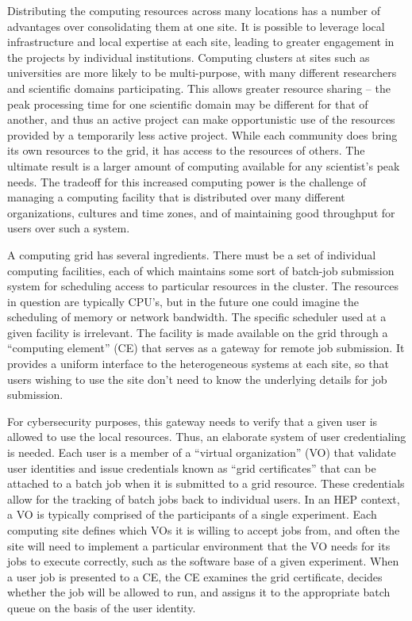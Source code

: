 Distributing the computing resources across many locations has a number of advantages over consolidating them at one site.  It is possible to leverage local infrastructure and local expertise at each site, leading to greater engagement in the projects by individual institutions.  Computing clusters at sites such as universities are more likely to be multi-purpose, with many different researchers and scientific domains participating.  This allows greater resource sharing -- the peak processing time for one scientific domain may be different for that of another, and thus an active project can make opportunistic use of the resources provided by a temporarily less active project.  While each community does bring its own resources to the grid, it has access to the resources of others.  The ultimate result is a larger amount of computing available for any scientist's peak needs.  The tradeoff for this increased computing power is the challenge of managing a computing facility that is distributed over many different organizations, cultures and time zones, and of maintaining good throughput for users over such a system.

A computing grid has several ingredients.  There must be a set of individual computing facilities, each of which maintains some sort of batch-job submission system for scheduling access to particular resources in the cluster.  The resources in question are typically CPU's, but in the future one could imagine the scheduling of memory or network bandwidth.  The specific scheduler used at a given facility is irrelevant.  The facility is made available on the grid through a ``computing element'' (CE) that serves as a gateway for remote job submission.  It provides a uniform interface to the heterogeneous systems at each site, so that users wishing to use the site don't need to know the underlying details for job submission.

For cybersecurity purposes, this gateway needs to verify that a given user is allowed to use the local resources.  Thus, an elaborate system of user credentialing is needed.  Each user is a member of a ``virtual organization'' (VO) that validate user identities and issue credentials known as ``grid certificates'' that can be attached to a batch job when it is submitted to a grid resource.  These credentials allow for the tracking of batch jobs back to individual users.  In an HEP context, a VO is typically comprised of the participants of a single experiment.  Each computing site defines which VOs it is willing to accept jobs from, and often the site will need to implement a particular environment that the VO needs for its jobs to execute correctly, such as the software base of a given experiment.  When a user job is presented to a CE, the CE examines the grid certificate, decides whether the job will be allowed to run, and assigns it to the appropriate batch queue on the basis of the user identity.

